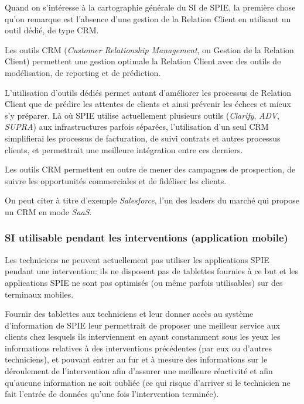             Quand on s'intéresse à la cartographie générale du SI de SPIE, la première chose qu'on remarque est l'absence d'une gestion de la Relation Client en utilisant un outil dédié, de type CRM.

            Les outils CRM (\textit{Customer Relationship Management}, ou Gestion de la Relation Client) permettent une gestion optimale la Relation Client avec des outils de modélisation, de reporting et de prédiction.

            L'utilisation d'outils dédiés permet autant d'améliorer les processus de Relation Client que de prédire les attentes de clients et ainsi prévenir les échecs et mieux s'y préparer. Là où SPIE utilise actuellement plusieurs outils (\textit{Clarify}, \textit{ADV}, \textit{SUPRA}) aux infrastructures parfois séparées, l'utilisation d'un seul CRM simplifierai les processus de facturation, de suivi contrats et autres processus clients, et permettrait une meilleure intégration entre ces derniers.

            Les outils CRM permettent en outre de mener des campagnes de prospection, de suivre les opportunités commerciales et de fidéliser les clients.

            On peut citer à titre d'exemple \textit{Salesforce}, l'un des leaders du marché qui propose un CRM en mode \textit{SaaS}.

        \subsubsection{SI utilisable pendant les interventions (application mobile)}

            Les techniciens ne peuvent actuellement pas utiliser les applications SPIE pendant une intervention: ils ne disposent pas de tablettes fournies à ce but et les applications SPIE ne sont pas optimisés (ou même parfois utilisables) sur des terminaux mobiles.

            Fournir des tablettes aux techniciens et leur donner accès au système d'information de SPIE leur permettrait de proposer une meilleur service aux clients chez lesquels ils interviennent en ayant constamment sous les yeux les informations relatives à des interventions précédentes (par eux ou d'autres techniciens), et pouvant entrer au fur et à mesure des informations sur le déroulement de l'intervention afin d'assurer une meilleure réactivité et afin qu'aucune information ne soit oubliée (ce qui risque d'arriver si le technicien ne fait l'entrée de données qu'une fois l'intervention terminée).


